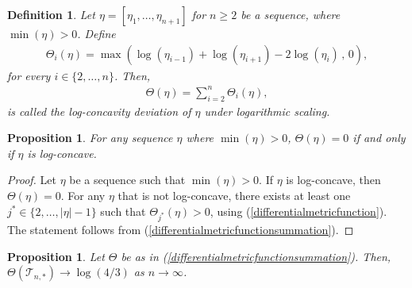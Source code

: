 \documentclass[a4paper,12pt]{article}
\newtheorem{defn}[thm]{Definition}
\newtheorem{prop}[thm]{Proposition}
\def\T{\mathcal{T}}
\begin{document}
\begin{defn}
Let $\eta = [\eta_1,\ldots,\eta_{n+1}]$ for $n\geq 2$ be a sequence, where $\min(\eta) > 0$. Define 
\begin{align}
\Theta_{i}(\eta) = \max\left( \log(\eta_{i-1}) + \log(\eta_{i+1}) - 2\log(\eta_i) \,,\, 0 \right), \label{differentialmetricfunction}
\end{align}
for every $i\in\{2,\ldots,n\}$. Then,
\begin{align}
\Theta(\eta) = \sum_{i=2}^{n} \Theta_{i}(\eta), \label{differentialmetricfunctionsummation}
\end{align}
is called the \emph{log-concavity deviation} of $\eta$ under logarithmic scaling.
\end{defn}
\begin{prop}
For any sequence $\eta$ where $\min(\eta) > 0$, $\Theta(\eta) = 0$ if and only if $\eta$ is log-concave.
\end{prop}
\begin{proof}
Let $\eta$ be a sequence such that $\min(\eta) > 0$. If $\eta$ is log-concave, then $\Theta(\eta) = 0$.  For any $\eta$ that is not log-concave, there exists at least one $j^*\in\{2,\ldots,|\eta|-1\}$ such that $\Theta_{j^*}(\eta) > 0$, using (\ref{differentialmetricfunction}). The statement follows from (\ref{differentialmetricfunctionsummation}). 
\end{proof}
\begin{prop}
\label{logconcavecorrection}
Let $\Theta$ be as in (\ref{differentialmetricfunctionsummation}). Then, $\Theta(\T_{n,*}) \rightarrow \log(4/3)$ as $n \rightarrow \infty$.
\end{prop}
\end{document}

